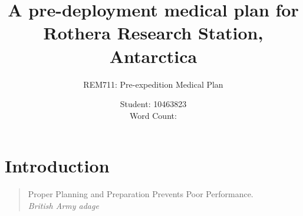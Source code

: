 \documentclass[12pt,a4paper]{article}
\title{A pre-deployment medical plan for Rothera Research Station, Antarctica}
\author{REM711: Pre-expedition Medical Plan}
\date{Student: 10463823 \\ Word Count: }
\begin{document}
\maketitle









\tableofcontents

\section{Introduction}

\begin{quote}
Proper Planning and Preparation Prevents Poor Performance. \\
\em British Army adage
\end{quote}
\end{document}
